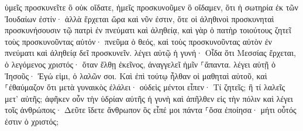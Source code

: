 \documentclass{openreader}
\begin{document}
ὑμεῖς προσκυνεῖτε ὃ οὐκ οἴδατε, ἡμεῖς προσκυνοῦμεν ὃ οἴδαμεν, ὅτι ἡ σωτηρία ἐκ τῶν Ἰουδαίων ἐστίν· 
ἀλλὰ ἔρχεται ὥρα καὶ νῦν ἐστιν, ὅτε οἱ ἀληθινοὶ προσκυνηταὶ προσκυνήσουσιν τῷ πατρὶ ἐν πνεύματι καὶ ἀληθείᾳ, καὶ γὰρ ὁ πατὴρ τοιούτους ζητεῖ τοὺς προσκυνοῦντας αὐτόν· 
πνεῦμα ὁ θεός, καὶ τοὺς προσκυνοῦντας αὐτὸν ἐν πνεύματι καὶ ἀληθείᾳ δεῖ προσκυνεῖν. 
λέγει αὐτῷ ἡ γυνή· Οἶδα ὅτι Μεσσίας ἔρχεται, ὁ λεγόμενος χριστός· ὅταν ἔλθῃ ἐκεῖνος, ἀναγγελεῖ ἡμῖν ⸀ἅπαντα. 
λέγει αὐτῇ ὁ Ἰησοῦς· Ἐγώ εἰμι, ὁ λαλῶν σοι. 
Καὶ ἐπὶ τούτῳ ἦλθαν οἱ μαθηταὶ αὐτοῦ, καὶ ⸀ἐθαύμαζον ὅτι μετὰ γυναικὸς ἐλάλει· οὐδεὶς μέντοι εἶπεν· Τί ζητεῖς; ἢ τί λαλεῖς μετ’ αὐτῆς; 
ἀφῆκεν οὖν τὴν ὑδρίαν αὐτῆς ἡ γυνὴ καὶ ἀπῆλθεν εἰς τὴν πόλιν καὶ λέγει τοῖς ἀνθρώποις· 
Δεῦτε ἴδετε ἄνθρωπον ὃς εἶπέ μοι πάντα ⸀ὅσα ἐποίησα· μήτι οὗτός ἐστιν ὁ χριστός; 
\end{document}
